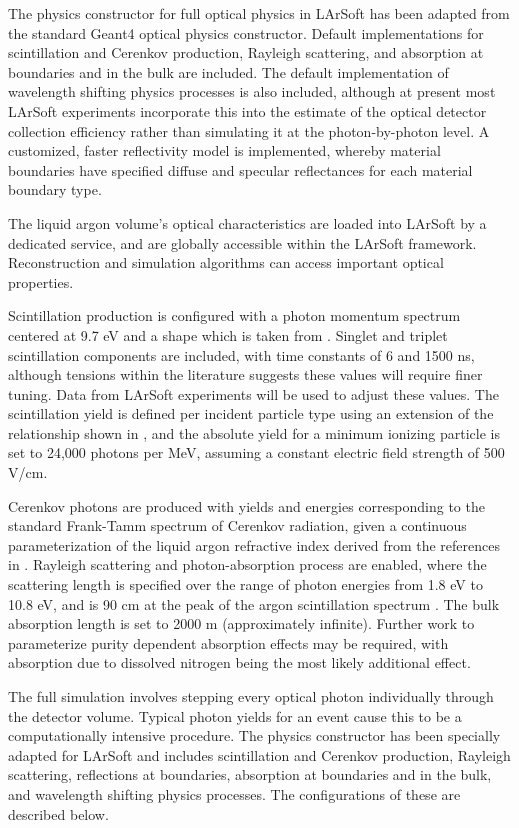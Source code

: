 \documentclass[12pt]{elsarticle}
\begin{document}
The physics constructor for full optical physics in LArSoft has been adapted from the standard Geant4 optical physics constructor. Default implementations for scintillation and Cerenkov production, Rayleigh scattering, and absorption at boundaries and in the bulk are included. The default implementation of wavelength shifting physics processes is also included, although at present most LArSoft experiments incorporate this into the estimate of the optical detector collection efficiency rather than simulating it at the photon-by-photon level.  A customized, faster reflectivity model is implemented, whereby material boundaries have specified diffuse and specular reflectances for each material boundary type.  

The liquid argon volume's optical characteristics are loaded into LArSoft by a dedicated service, and are globally accessible within the LArSoft framework.  Reconstruction and simulation algorithms can access important optical properties.

Scintillation production is configured with a photon momentum spectrum centered at 9.7 eV and a shape which is taken from \cite{spectrum}.  Singlet and triplet scintillation components are included, with time constants of 6 and 1500 ns, although tensions within the literature suggests these values will require finer tuning.\cite{fastslow} Data from LArSoft experiments will be used to adjust these values.  The scintillation yield is defined per incident particle type using an extension of the relationship shown in \cite{scintyield}, and the absolute yield for a minimum ionizing particle is set to 24,000 photons per MeV, assuming a constant electric field strength of 500 V/cm. 

Cerenkov photons are produced with yields and energies corresponding to the standard Frank-Tamm spectrum of Cerenkov radiation, given a continuous parameterization of the liquid argon refractive index derived from the references in \cite{RIndex}. Rayleigh scattering and photon-absorption process are enabled, where the scattering length is specified over the range of photon energies from 1.8 eV to 10.8 eV, and is 90 cm at the peak of the argon scintillation spectrum \cite{Rlength}.  The bulk absorption length is set to 2000 m (approximately infinite). Further work to parameterize purity dependent absorption effects may be required, with absorption due to dissolved nitrogen being the most likely additional effect\cite{nitrogen}.

\label{sec:fullopticalsim}
The full simulation involves stepping every optical photon individually through the detector volume.  Typical photon yields for an event cause this to be a computationally intensive procedure. The physics constructor has been specially adapted for LArSoft and includes scintillation and Cerenkov production, Rayleigh scattering, reflections at boundaries, absorption at boundaries and in the bulk, and wavelength shifting physics processes.  The configurations of these are described below.
\end{document}
